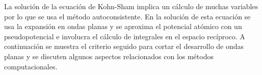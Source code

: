 La soluci\'on de la ecuaci\'on de Kohn-Sham implica un c\'alculo de muchas 
variables por lo que se usa el m\'etodo autoconsistente. En la soluci\'on de esta ecuaci\'on se usa la expansi\'on en ondas planas y se aproxima el potencial at\'omico con un pseudopotencial e involucra el c\'alculo de integrales en el espacio rec\'iproco. A continuaci\'on se muestra el criterio seguido para cortar el desarrollo de ondas planas y se discuten algunos aspectos relacionados con los m\'etodos computacionales.